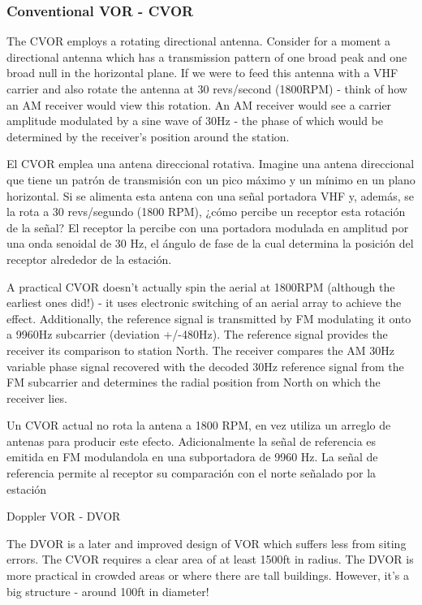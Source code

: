 \subsubsection*{Conventional VOR - CVOR}
\label{Convencional VOR - CVOR}

The CVOR employs a rotating directional antenna. Consider for a moment a directional antenna which has a transmission pattern of one broad peak and one broad null in the horizontal plane. If we were to feed this antenna with a VHF carrier and also rotate the antenna at 30 revs/second (1800RPM) - think of how an AM receiver would view this rotation. An AM receiver would see a carrier amplitude modulated by a sine wave of 30Hz - the phase of which would be determined by the receiver's position around the station.

El CVOR emplea una antena direccional rotativa. Imagine una antena direccional que tiene un patrón de transmisión con un pico máximo y un mínimo en un plano horizontal. Si se alimenta esta antena con una señal portadora VHF y, además, se la rota a 30 revs/segundo (1800 RPM), ¿cómo percibe un receptor esta rotación de la señal? El receptor la percibe con una portadora modulada en amplitud por una onda senoidal de 30 Hz, el ángulo de fase de la cual determina la posición del receptor alrededor de la estación.

A practical CVOR doesn't actually spin the aerial at 1800RPM (although the earliest ones did!) - it uses electronic switching of an aerial array to achieve the effect. Additionally, the reference signal is transmitted by FM modulating it onto a 9960Hz subcarrier (deviation +/-480Hz). The reference signal provides the receiver its comparison to station North. The receiver compares the AM 30Hz variable phase signal recovered with the decoded 30Hz reference signal from the FM subcarrier and determines the radial position from North on which the receiver lies.

Un CVOR actual no rota la antena a 1800 RPM, en vez utiliza un arreglo de antenas para producir este efecto. Adicionalmente la señal de referencia es emitida en FM modulandola en una subportadora de 9960 Hz. La señal de referencia permite al receptor su comparación con el norte señalado por la estación

Doppler VOR - DVOR

The DVOR is a later and improved design of VOR which suffers less from siting errors. The CVOR requires a clear area of at least 1500ft in radius. The DVOR is more practical in crowded areas or where there are tall buildings. However, it's a big structure - around 100ft in diameter!

